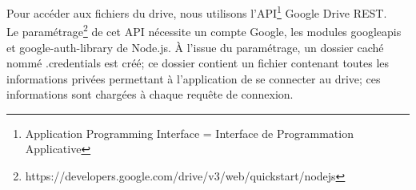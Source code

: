 \par
Pour accéder aux fichiers du drive, nous utilisons l'API\footnote{Application Programming Interface = Interface de Programmation Applicative} Google Drive REST.\\
Le paramétrage\footnote{https://developers.google.com/drive/v3/web/quickstart/nodejs} de cet API nécessite un compte Google, les modules googleapis et google-auth-library de Node.js. À l'issue du paramétrage, un dossier caché nommé .credentials est créé; ce dossier contient un fichier contenant toutes les informations privées permettant à l'application de se connecter au drive; ces informations sont chargées à chaque requête de connexion.